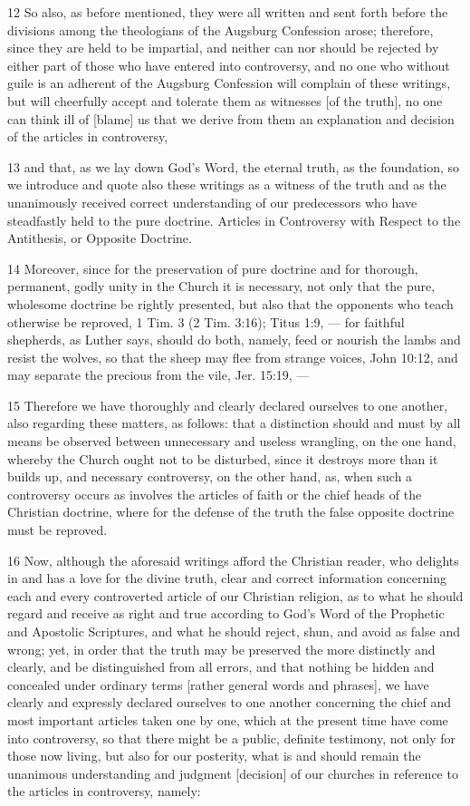 12 So also, as before mentioned, they were all written and sent forth before the divisions among the theologians of the Augsburg Confession arose; therefore, since they are held to be impartial, and neither can nor should be rejected by either part of those who have entered into controversy, and no one who without guile is an adherent of the Augsburg Confession will complain of these writings, but will cheerfully accept and tolerate them as witnesses [of the truth], no one can think ill of [blame] us that we derive from them an explanation and decision of the articles in controversy,

13 and that, as we lay down God’s Word, the eternal truth, as the foundation, so we introduce and quote also these writings as a witness of the truth and as the unanimously received correct understanding of our predecessors who have steadfastly held to the pure doctrine.
Articles in Controversy with Respect to the Antithesis, or Opposite Doctrine.

14 Moreover, since for the preservation of pure doctrine and for thorough, permanent, godly unity in the Church it is necessary, not only that the pure, wholesome doctrine be rightly presented, but also that the opponents who teach otherwise be reproved, 1 Tim. 3 (2 Tim. 3:16); Titus 1:9, — for faithful shepherds, as Luther says, should do both, namely, feed or nourish the lambs and resist the wolves, so that the sheep may flee from strange voices, John 10:12, and may separate the precious from the vile, Jer. 15:19, —

15 Therefore we have thoroughly and clearly declared ourselves to one another, also regarding these matters, as follows: that a distinction should and must by all means be observed between unnecessary and useless wrangling, on the one hand, whereby the Church ought not to be disturbed, since it destroys more than it builds up, and necessary controversy, on the other hand, as, when such a controversy occurs as involves the articles of faith or the chief heads of the Christian doctrine, where for the defense of the truth the false opposite doctrine must be reproved.

16 Now, although the aforesaid writings afford the Christian reader, who delights in and has a love for the divine truth, clear and correct information concerning each and every controverted article of our Christian religion, as to what he should regard and receive as right and true according to God’s Word of the Prophetic and Apostolic Scriptures, and what he should reject, shun, and avoid as false and wrong; yet, in order that the truth may be preserved the more distinctly and clearly, and be distinguished from all errors, and that nothing be hidden and concealed under ordinary terms [rather general words and phrases], we have clearly and expressly declared ourselves to one another concerning the chief and most important articles taken one by one, which at the present time have come into controversy, so that there might be a public, definite testimony, not only for those now living, but also for our posterity, what is and should remain the unanimous understanding and judgment [decision] of our churches in reference to the articles in controversy, namely:

